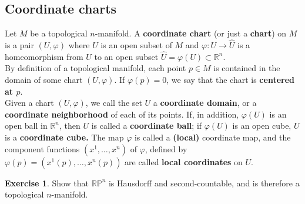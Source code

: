 \documentclass[reqno]{amsart}
\theoremstyle{plain}%
\theoremstyle{definition}
\newtheorem{exercise}[theorem]{Exercise}
\theoremstyle{remark}
\begin{document}
    \subsection*{Coordinate charts}
        Let $M$ be a topological $n$-manifold. A
        \textbf{coordinate chart} (or just a \textbf{chart}) on $M$ is a pair
        $\left( U, \varphi \right) $ where $U$ is an open subset of $M$ and
        $\varphi  \colon U \to \hat{U}$ is a homeomorphism from $U$ to
        an open subset $\hat{U} = \varphi(U) \subset \mathbb{R}^{n}$.\\
        \linebreak
        By definition of a topological manifold, each point $p \in M$ is contained in
        the domain of some chart $\left( U, \varphi \right) $. If
        $\varphi (p) = 0$, we say that the chart is \textbf{centered at $p$}.\\
        \linebreak
        Given a chart $\left( U, \varphi \right) $, we call the set $U$
        a \textbf{coordinate domain}, or a \textbf{coordinate neighborhood} of each of
        its points. If, in addition, $\varphi (U)$ is an open ball in $\mathbb{R}^{n}$,
        then $U$ is called a \textbf{coordinate ball}; if $\varphi(U)$ is an open cube,
        $U$ is a \textbf{coordinate cube.} The map $\varphi$ is called a 
        \textbf{(local)} coordinate map, and the component functions
        $\left( x^{1}, \ldots, x^{n} \right) $ of $\varphi$, defined by
        $\varphi (p) = \left( x^{1}(p), \ldots, x^{n}(p) \right) $ are called
        \textbf{local coordinates} on $U$.
        \begin{exercise}
             Show that $\mathbb{R}\mathbb{P}^{n}$ is Hausdorff and
        second-countable, and is therefore a topological $n$-manifold.
        \end{exercise}
\end{document}
